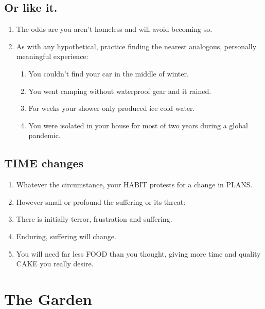 \documentclass[
]{book}
\providecommand{\tightlist}{%
  \setlength{\itemsep}{0pt}\setlength{\parskip}{0pt}}
\begin{document}
\hypertarget{or-like-it.}{%
\subsection{Or like it.}\label{or-like-it.}}

\begin{enumerate}
\def\labelenumi{\arabic{enumi}.}
\setcounter{enumi}{28}
\tightlist
\item
  The odds are you aren't homeless and will avoid becoming so.
\item
  As with any hypothetical, practice finding the nearest analogous, personally meaningful experience:

  \begin{enumerate}
  \def\labelenumii{\arabic{enumii}.}
  \tightlist
  \item
    You couldn't find your car in the middle of winter.
  \item
    You went camping without waterproof gear and it rained.
  \item
    For weeks your shower only produced ice cold water.
  \item
    You were isolated in your house for most of two years during a global pandemic.
  \end{enumerate}
\end{enumerate}

\hypertarget{time-changes}{%
\subsection{TIME changes}\label{time-changes}}

\begin{enumerate}
\def\labelenumi{\arabic{enumi}.}
\setcounter{enumi}{30}
\tightlist
\item
  Whatever the circumstance, your HABIT protests for a change in PLANS.
\item
  However small or profound the suffering or its threat:
\item
  There is initially terror, frustration and suffering.
\item
  Enduring, suffering will change.
\item
  You will need far less FOOD than you thought, giving more time and quality CAKE you really desire.
\end{enumerate}

\hypertarget{the-garden}{%
\section{The Garden}\label{the-garden}}
\end{document}
